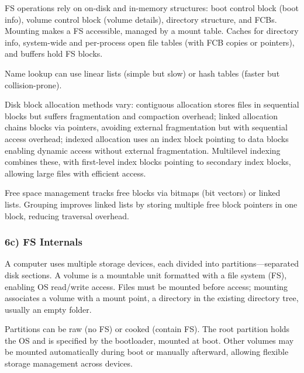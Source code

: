 FS operations rely on on-disk and in-memory structures: boot control block (boot info), volume control block (volume details), directory structure, and FCBs. Mounting makes a FS accessible, managed by a mount table. Caches for directory info, system-wide and per-process open file tables (with FCB copies or pointers), and buffers hold FS blocks.

Name lookup can use linear lists (simple but slow) or hash tables (faster but collision-prone).

Disk block allocation methods vary: contiguous allocation stores files in sequential blocks but suffers fragmentation and compaction overhead; linked allocation chains blocks via pointers, avoiding external fragmentation but with sequential access overhead; indexed allocation uses an index block pointing to data blocks enabling dynamic access without external fragmentation. Multilevel indexing combines these, with first-level index blocks pointing to secondary index blocks, allowing large files with efficient access.

Free space management tracks free blocks via bitmaps (bit vectors) or linked lists. Grouping improves linked lists by storing multiple free block pointers in one block, reducing traversal overhead.

\subsubsection*{6c) FS Internals}
A computer uses multiple storage devices, each divided into partitions—separated disk sections. A volume is a mountable unit formatted with a file system (FS), enabling OS read/write access. Files must be mounted before access; mounting associates a volume with a mount point, a directory in the existing directory tree, usually an empty folder.

Partitions can be raw (no FS) or cooked (contain FS). The root partition holds the OS and is specified by the bootloader, mounted at boot. Other volumes may be mounted automatically during boot or manually afterward, allowing flexible storage management across devices.
